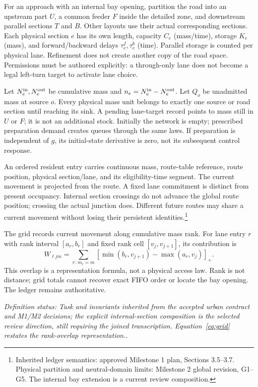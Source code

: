 \documentclass[11pt]{article}
\newcommand{\pos}[1]{\left[#1\right]_+}
\newcommand{\status}[1]{\textit{Definition status: #1.}}
\begin{document}
For an approach with an internal bay opening, partition the road into an upstream part $U$, a common feeder $F$ inside the detailed zone, and downstream parallel sections $T$ and $B$. Other layouts use their actual corresponding sections. Each physical section $e$ has its own length, capacity $C_e$ (mass/time), storage $K_e$ (mass), and forward/backward delays $\tau^f_e,\tau^b_e$ (time). Parallel storage is counted per physical lane. Refinement does not create another copy of the road space. Permissions must be authored explicitly: a through-only lane does not become a legal left-turn target to activate lane choice.

Let $N^{\rm in}_e,N^{\rm out}_e$ be cumulative mass and $n_e=N^{\rm in}_e-N^{\rm out}_e$. Let $Q_o$ be unadmitted mass at source $o$. Every physical mass unit belongs to exactly one source or road section until reaching its sink. A pending lane-target record points to mass still in $U$ or $F$; it is not an additional stock. Initially the network is empty; prescribed preparation demand creates queues through the same laws. If preparation is independent of $g$, its initial-state derivative is zero, not its subsequent control response.

An ordered resident entry carries continuous mass, route-table reference, route position, physical section/lane, and its eligibility-time segment. The current movement is projected from the route. A fixed lane commitment is distinct from present occupancy. Internal section crossings do not advance the global route position; crossing the actual junction does. Different future routes may share a current movement without losing their persistent identities.\footnote{Inherited ledger semantics: approved Milestone 1 plan, Sections 3.5--3.7. Physical partition and neutral-domain limits: Milestone 2 global revision, G1--G5. The internal bay extension is a current review composition.}

The grid records current movement along cumulative mass rank. For lane entry $r$ with rank interval $[a_r,b_r]$ and fixed rank cell $[v_j,v_{j+1}]$, its contribution is
\begin{equation}
 W_{\ell jm}=\sum_{r:\,m_r=m}
 \pos{\min(b_r,v_{j+1})-\max(a_r,v_j)}.
 \label{eq:grid}
\end{equation}
This overlap is a representation formula, not a physical access law. Rank is not distance; grid totals cannot recover exact FIFO order or locate the bay opening. The ledger remains authoritative.

\status{Task and invariants inherited from the accepted urban contract and M1/M2 decisions; the explicit internal-section composition is the selected review direction, still requiring the joined transcription. Equation~\eqref{eq:grid} restates the rank-overlap representation.}
\end{document}
